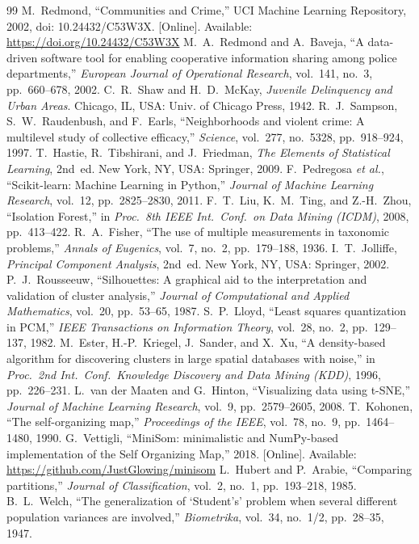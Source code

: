 \documentclass{ieeeaccess}
\begin{document}
\begin{thebibliography}{99}
M.~Redmond, ``Communities and Crime,'' UCI Machine Learning Repository, 2002, doi: 10.24432/C53W3X. [Online]. Available: \url{https://doi.org/10.24432/C53W3X}
M.~A.~Redmond and A.~Baveja, ``A data-driven software tool for enabling cooperative information sharing among police departments,'' \emph{European Journal of Operational Research}, vol.~141, no.~3, pp.~660--678, 2002.
C.~R.~Shaw and H.~D.~McKay, \emph{Juvenile Delinquency and Urban Areas}. Chicago, IL, USA: Univ. of Chicago Press, 1942.
R.~J.~Sampson, S.~W.~Raudenbush, and F.~Earls, ``Neighborhoods and violent crime: A multilevel study of collective efficacy,'' \emph{Science}, vol.~277, no.~5328, pp.~918--924, 1997.
T.~Hastie, R.~Tibshirani, and J.~Friedman, \emph{The Elements of Statistical Learning}, 2nd~ed. New York, NY, USA: Springer, 2009.
F.~Pedregosa \emph{et al.}, ``Scikit-learn: Machine Learning in Python,'' \emph{Journal of Machine Learning Research}, vol.~12, pp.~2825--2830, 2011.
F.~T.~Liu, K.~M.~Ting, and Z.-H.~Zhou, ``Isolation Forest,'' in \emph{Proc.\ 8th IEEE Int.\ Conf.\ on Data Mining (ICDM)}, 2008, pp.~413--422.
R.~A.~Fisher, ``The use of multiple measurements in taxonomic problems,'' \emph{Annals of Eugenics}, vol.~7, no.~2, pp.~179--188, 1936.
I.~T.~Jolliffe, \emph{Principal Component Analysis}, 2nd~ed. New York, NY, USA: Springer, 2002.
P.~J.~Rousseeuw, ``Silhouettes: A graphical aid to the interpretation and validation of cluster analysis,'' \emph{Journal of Computational and Applied Mathematics}, vol.~20, pp.~53--65, 1987.
S.~P.~Lloyd, ``Least squares quantization in PCM,'' \emph{IEEE Transactions on Information Theory}, vol.~28, no.~2, pp.~129--137, 1982.
M.~Ester, H.-P.~Kriegel, J.~Sander, and X.~Xu, ``A density-based algorithm for discovering clusters in large spatial databases with noise,'' in \emph{Proc.\ 2nd Int.\ Conf.\ Knowledge Discovery and Data Mining (KDD)}, 1996, pp.~226--231.
L.~van der Maaten and G.~Hinton, ``Visualizing data using t-SNE,'' \emph{Journal of Machine Learning Research}, vol.~9, pp.~2579--2605, 2008.
T.~Kohonen, ``The self-organizing map,'' \emph{Proceedings of the IEEE}, vol.~78, no.~9, pp.~1464--1480, 1990.
G.~Vettigli, ``MiniSom: minimalistic and NumPy-based implementation of the Self Organizing Map,'' 2018. [Online]. Available: \url{https://github.com/JustGlowing/minisom}
L.~Hubert and P.~Arabie, ``Comparing partitions,'' \emph{Journal of Classification}, vol.~2, no.~1, pp.~193--218, 1985.
B.~L.~Welch, ``The generalization of `Student's' problem when several different population variances are involved,'' \emph{Biometrika}, vol.~34, no.~1/2, pp.~28--35, 1947.
\end{thebibliography}
\end{document}
